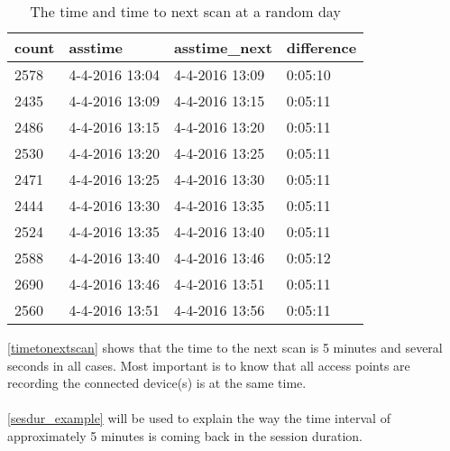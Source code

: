 \begin{table}[H]
	\centering
	\captionsetup{justification=centering}
	\caption{The time and time to next scan at a random day}
	\label{timetonextscan}
	\begin{tabular}{@{}llll@{}}
		\toprule
		count & asstime        & asstime\_next  & difference \\ \midrule
		2578  & 4-4-2016 13:04 & 4-4-2016 13:09 & 0:05:10    \\
		2435  & 4-4-2016 13:09 & 4-4-2016 13:15 & 0:05:11    \\
		2486  & 4-4-2016 13:15 & 4-4-2016 13:20 & 0:05:11    \\
		2530  & 4-4-2016 13:20 & 4-4-2016 13:25 & 0:05:11    \\
		2471  & 4-4-2016 13:25 & 4-4-2016 13:30 & 0:05:11    \\
		2444  & 4-4-2016 13:30 & 4-4-2016 13:35 & 0:05:11    \\
		2524  & 4-4-2016 13:35 & 4-4-2016 13:40 & 0:05:11    \\
		2588  & 4-4-2016 13:40 & 4-4-2016 13:46 & 0:05:12    \\
		2690  & 4-4-2016 13:46 & 4-4-2016 13:51 & 0:05:11    \\
		2560  & 4-4-2016 13:51 & 4-4-2016 13:56 & 0:05:11    \\ \bottomrule
	\end{tabular}
\end{table}

         
\autoref{timetonextscan} shows that the time to the next scan is 5 minutes and several seconds in all cases. Most important is to know that all access points are recording the connected device(s) is at the same time. 
\\\\                                                        
\autoref{sesdur_example} will be used to explain the way the time interval of approximately 5 minutes is coming back in the session duration.
                                                                       

